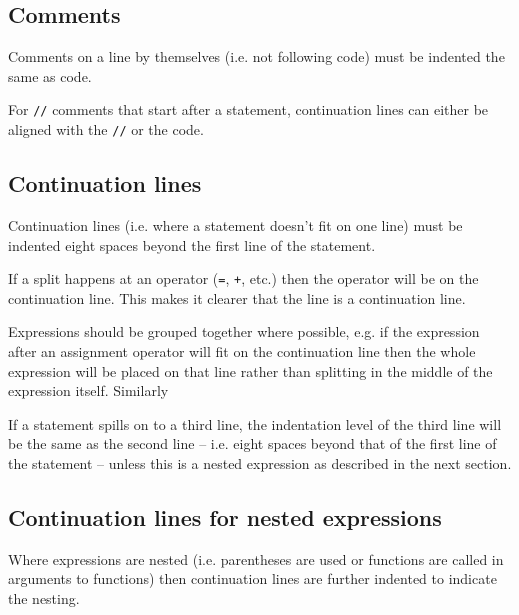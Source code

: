 \documentclass{article}
\begin{document}
\nolinenumbers
{}

\linenumbers

\subsection{Comments}
Comments on a line by themselves (i.e. not following code) must be indented the same as code.

For \texttt{//} comments that start after a statement, continuation lines can either be aligned with the \texttt{//} or the code.

\nolinenumbers
{}

	\linenumbers

\subsection{Continuation lines}
Continuation lines (i.e. where a statement doesn't fit on one line) must be indented eight spaces 
beyond the first line of the statement. 

If a split happens at an operator (\texttt{=}, \texttt{+}, etc.) then the operator will be on the continuation line. 
This makes it clearer that the line is a continuation line. 

Expressions should be grouped together where possible, e.g. if the expression after an assignment operator will fit on the continuation line then the whole expression will be placed on that line rather than splitting in the 
middle of the expression itself. Similarly

If a statement spills on to a third line, the indentation 
level of the third line will be the same as the second line -- i.e. eight spaces beyond that of the first line of 
the statement -- unless this is a nested expression as described in the next section.

\nolinenumbers
{}

\linenumbers

\subsection{Continuation lines for nested expressions}

Where expressions are nested (i.e. parentheses are used or functions are called in arguments to functions)
then continuation lines are further indented to indicate the nesting. 
\end{document}
